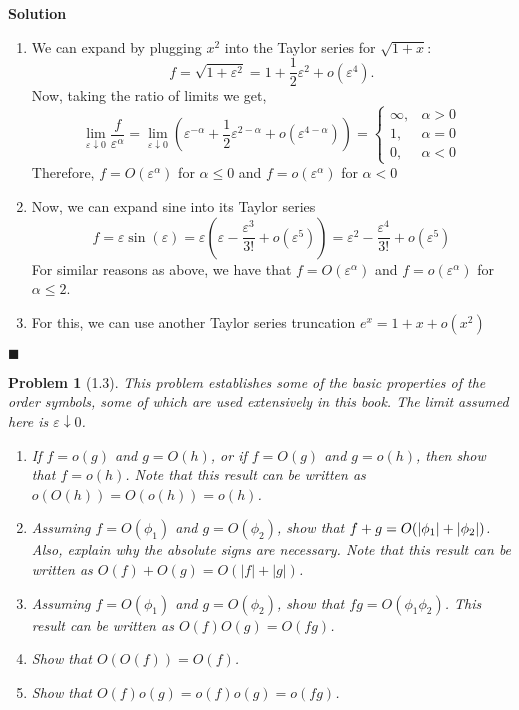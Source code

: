 \documentclass[11pt]{article}
\newcommand{\vep}{\varepsilon}
\DeclarePairedDelimiter\abs{\lvert}{\rvert}
\theoremstyle{problemstyle}
\newtheorem{problem}{Problem}
\newenvironment{solution}
  {\noindent\textbf{Solution}\quad}
  {\hfill$\blacksquare$\par\vspace{1em}}
\begin{document}
\begin{solution}
  \begin{enumerate}[label=(\roman*)]
    \item We can expand by plugging $x^2$ into the Taylor series for $\sqrt{1+x}$:
      \[ f = \sqrt{1 + \vep^2} = 1 + \frac{1}{2}\vep^2 + o(\vep^4). \]
      Now, taking the ratio of limits we get,
      \[ \lim_{\vep \downarrow 0} \frac{f}{\vep^\alpha} = \lim_{\vep \downarrow 0}
        \left(\vep^{-\alpha} + \frac{1}{2}\vep^{2-\alpha} + o(\vep^{4-\alpha}) \right) =
        \begin{cases}
        \infty, & \alpha > 0 \\
        1 , & \alpha = 0 \\
        0 , & \alpha < 0 
      \end{cases}\]
      Therefore, $f = O(\vep^\alpha)$ for $\alpha \leq 0$ and $f = o(\vep^\alpha)$ for $\alpha < 0$
    \item Now, we can expand sine into its Taylor series
      \[ f = \vep \sin(\vep) = \vep \left( \vep - \frac{\vep^3}{3!} + o(\vep^5) \right) = \vep^2 -
      \frac{\vep^4}{3!} + o(\vep^5) \]
      For similar reasons as above, we have that $f = O(\vep^\alpha)$ and $f = o(\vep^\alpha)$ for
      $\alpha \leq 2$.
    \item For this, we can use another Taylor series truncation $e^x = 1 + x + o(x^2)$
      

  \end{enumerate}
\end{solution}

\newpage
\begin{problem}[1.3]
This problem establishes some of the basic properties of the order symbols, some of which are used
extensively in this book. The limit assumed here is $\vep \downarrow 0$.
\begin{enumerate}
\item If $f = o(g)$ and $g = O(h)$, or if $f = O(g)$ and $g = o(h)$, then show that $f = o(h)$. Note
  that this result can be written as $o(O(h)) = O(o(h)) = o(h)$.
\item Assuming $f = O(\phi_1)$ and $g = O(\phi_2)$, show that $f + g = O(\abs{\phi_1}  + \vert
  \phi_2 \vert)$. Also, explain why the absolute signs are necessary. Note that this result can be
  written as $O(f) + O(g) = O(|f| + |g|)$.
\item Assuming $f = O(\phi_1)$ and $g = O(\phi_2)$, show that $fg = O(\phi_1 \phi_2)$. This result
  can be written as $O(f) O(g) = O(fg)$.
\item Show that $O(O(f)) = O(f)$.
\item Show that $O(f)o(g) = o(f)o(g) = o(fg)$.
\end{enumerate}
\end{problem}
\end{document}
